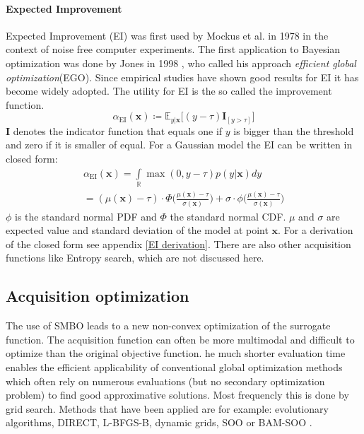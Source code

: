 \documentclass[english]{article}
\newcommand{\EI}{\operatorname{EI}}
\newcommand{\x}{\mathbf{x}}
\newcommand{\E}{\mathbb{E}}
\begin{document}
\paragraph{Expected Improvement}
Expected Improvement (EI) was first used by Mockus et al. in 1978 \cite{mockus_application_1978} in the context of noise free computer experiments. The first application to Bayesian optimization was done by Jones in 1998 \cite{jones_efficient_1998}, who called his approach \textit{efficient global optimization}(EGO). Since empirical studies have shown good results for EI it has become widely adopted. The utility for EI is the so called the improvement function.
\begin{equation}
  \alpha_{\EI}(\x) \coloneqq \E_{y|\x}\big[(y - \tau)\mathbf{I}_{[y > \tau]}\big]
\end{equation}
$\mathbf{I}$ denotes the indicator function that equals one if $y$ is bigger than the threshold and zero if it is smaller of equal. For a Gaussian model the EI can be written in closed form:
\begin{equation}
  \begin{split}
    \alpha_{\EI}(\x) = \int\limits_{\mathbb{R}} \max(0, y-\tau)p(y|\x)dy
    \\
    = (\mu(\x) - \tau) \cdot \Phi \bigg(\frac{\mu(\x)-\tau}{\sigma(\x)}\bigg) + \sigma \cdot \phi \bigg(\frac{\mu(\x)-\tau}{\sigma(\x)}\bigg)
  \end{split}
\end{equation}
$\phi$ is the standard normal PDF and $\Phi$ the standard normal CDF. $\mu$ and $\sigma$ are expected value and standard deviation of the model at point $\x$.
For a derivation of the closed form see appendix \ref{EI derivation}.
There are also other acquisition functions like Entropy search, which are not discussed here.

\subsection*{Acquisition optimization}
The use of SMBO leads to a new non-convex optimization of the surrogate function. The acquisition function can often be more multimodal and difficult to optimize than the original objective function. he much shorter evaluation time enables the efficient applicability of conventional global optimization methods which often rely on numerous evaluations (but no secondary optimization problem) to find good approximative solutions.
Most frequencly this is done by grid search. Methods that have been applied are for example: evolutionary algorithms, DIRECT, L-BFGS-B, dynamic grids, SOO or BAM-SOO \cite{shahriari_taking_2016}.
\end{document}
